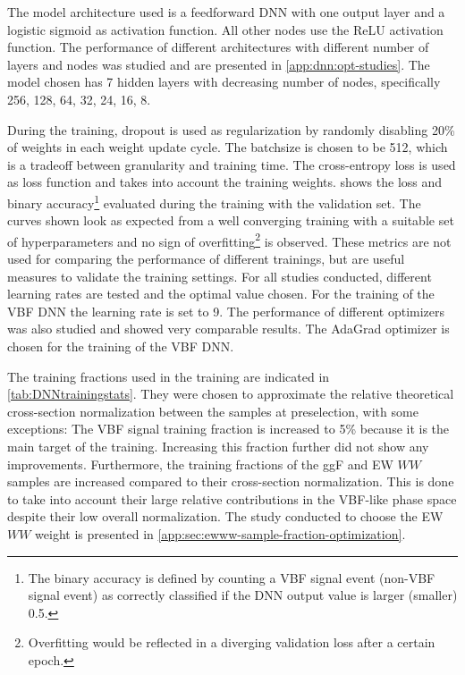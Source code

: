 The model architecture used is a feedforward DNN with one output layer and a logistic sigmoid as activation function. All other nodes use the ReLU activation function.
The performance of different architectures with different number of layers and nodes was studied and are presented in \cref{app:dnn:opt-studies}.
The model chosen has 7 hidden layers with decreasing number of nodes, specifically {256, 128, 64, 32, 24, 16, 8}.

During the training, dropout is used as regularization by randomly disabling 20\% of weights in each weight update cycle.
The batchsize is chosen to be 512, which is a tradeoff between granularity and training time.
The cross-entropy loss is used as loss function and takes into account the training weights.
 shows the loss and binary accuracy\footnote{The binary accuracy is defined by counting a VBF signal event (non-VBF signal event) as correctly classified if the DNN output value is larger (smaller) 0.5.
} evaluated during the training with the validation set.
The curves shown look as expected from a well converging training with a suitable set of hyperparameters and no sign of overfitting\footnote{Overfitting would be reflected in a diverging validation loss after a certain epoch.} is observed. These metrics are not used for comparing the performance of different trainings, but are useful measures to validate the training settings. For all studies conducted, different learning rates are tested and the optimal value chosen.
For the training of the VBF DNN the learning rate is set to 9.
The performance of different optimizers was also studied and showed very comparable results. The AdaGrad optimizer is chosen for the training of the VBF DNN.

The training fractions used in the training are indicated in \cref{tab:DNNtrainingstats}. They were chosen to approximate the relative theoretical cross-section normalization between the samples at preselection, with some exceptions: The VBF signal training fraction is increased to 5\% because it is the main target of the training. Increasing this fraction further did not show any improvements. Furthermore, the training fractions of the ggF and EW $WW$ samples are increased compared to their cross-section normalization. This is done to take into account their large relative contributions in the VBF-like phase space despite their low overall normalization. The study conducted to choose the EW $WW$ weight is presented in \cref{app:sec:ewww-sample-fraction-optimization}.

